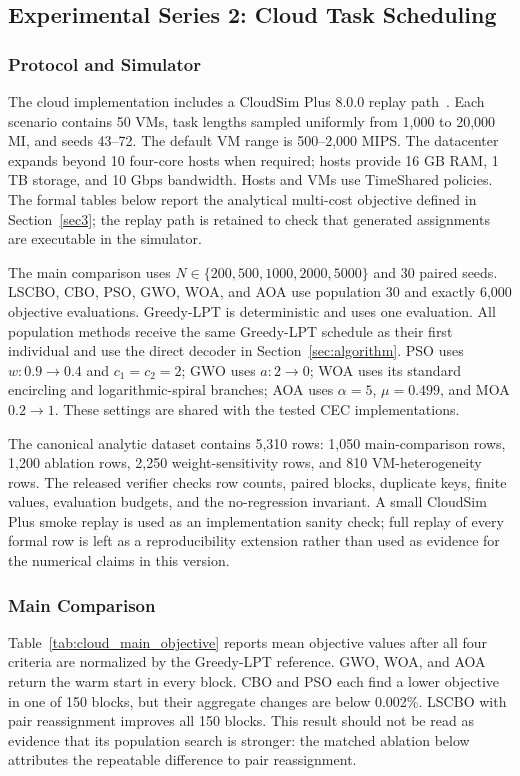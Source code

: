 \documentclass[pdflatex,onecolumn,sn-mathphys-num]{sn-jnl}
\begin{document}
\subsection{Experimental Series 2: Cloud Task Scheduling}\label{sec:cloudsim_exp}

\subsubsection{Protocol and Simulator}
The cloud implementation includes a CloudSim Plus 8.0.0 replay path~\cite{Calheiros2011,SilvaFilho2017}. Each scenario contains 50 VMs, task lengths sampled uniformly from 1,000 to 20,000 MI, and seeds 43--72. The default VM range is 500--2,000 MIPS. The datacenter expands beyond 10 four-core hosts when required; hosts provide 16 GB RAM, 1 TB storage, and 10 Gbps bandwidth. Hosts and VMs use TimeShared policies. The formal tables below report the analytical multi-cost objective defined in Section~\ref{sec3}; the replay path is retained to check that generated assignments are executable in the simulator.

The main comparison uses $N\in\{200,500,1000,2000,5000\}$ and 30 paired seeds. LSCBO, CBO, PSO, GWO, WOA, and AOA use population 30 and exactly 6,000 objective evaluations. Greedy-LPT is deterministic and uses one evaluation. All population methods receive the same Greedy-LPT schedule as their first individual and use the direct decoder in Section~\ref{sec:algorithm}. PSO uses $w:0.9\rightarrow0.4$ and $c_1=c_2=2$; GWO uses $a:2\rightarrow0$; WOA uses its standard encircling and logarithmic-spiral branches; AOA uses $\alpha=5$, $\mu=0.499$, and MOA $0.2\rightarrow1$. These settings are shared with the tested CEC implementations.

The canonical analytic dataset contains 5,310 rows: 1,050 main-comparison rows, 1,200 ablation rows, 2,250 weight-sensitivity rows, and 810 VM-heterogeneity rows. The released verifier checks row counts, paired blocks, duplicate keys, finite values, evaluation budgets, and the no-regression invariant. A small CloudSim Plus smoke replay is used as an implementation sanity check; full replay of every formal row is left as a reproducibility extension rather than used as evidence for the numerical claims in this version.

\subsubsection{Main Comparison}
Table~\ref{tab:cloud_main_objective} reports mean objective values after all four criteria are normalized by the Greedy-LPT reference. GWO, WOA, and AOA return the warm start in every block. CBO and PSO each find a lower objective in one of 150 blocks, but their aggregate changes are below 0.002\%. LSCBO with pair reassignment improves all 150 blocks. This result should not be read as evidence that its population search is stronger: the matched ablation below attributes the repeatable difference to pair reassignment.
\end{document}
